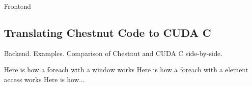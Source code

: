 Frontend

\subsection{Translating Chestnut Code to CUDA C}

Backend. Examples. Comparison of Chestnut and CUDA C side-by-side.

Here is how a foreach with a window works
Here is how a foreach with a element access works
Here is how...

   

